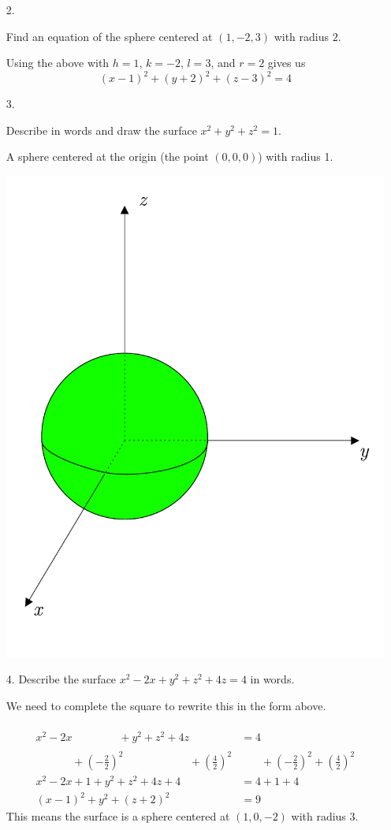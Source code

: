 \documentclass[12pt]{exam}
\begin{document}
  \begin{enumerate}
    \item[2.]{
      Find an equation of the sphere centered at $(1,-2,3)$ with radius $2$.
      \begin{solution}
        Using the above with \(h=1\), \(k=-2\), \(l=3\), and \(r=2\) gives us
        \[
          (x-1)^2+(y+2)^2+(z-3)^2=4
        \]
      \end{solution}
    }
    \item[3.]{
      Describe in words and draw the surface $x^{2}+y^{2}+z^{2}=1$.
      \begin{solution}
        A sphere centered at the origin (the point \((0,0,0)\)) with radius 1.
      \begin{center}
        \includegraphics[width=.6\textwidth]{12-1-sphere.pdf}
      \end{center}
      \end{solution}
    }
    \item[4.]{
      Describe the surface $x^{2}-2x+y^{2}+z^{2}+4z=4$ in words.
    }
    \begin{solution}
      We need to complete the square to rewrite this in the form above.

      \begin{align*}
        x^2-2x\phantom{+(-\frac{2}{2})^2}+y^2+z^2+4z\phantom{+(\frac{4}{2})^2} & = 4\\
      \phantom{x^2-2x}+\left(-\frac{2}{2}\right)^2\phantom{+y^2+z^2+4z}+\left(\frac{4}{2}\right)^2 &\phantom{ = 4} +\left(-\frac{2}{2}\right)^2+\left(\frac{4}{2}\right)^2\\
      x^2-2x+1+y^2+z^2+4z+4 & = 4+1+4\\
      (x-1)^2 + y^2 + (z+2)^2 & = 9
      \end{align*}
      This means the surface is a sphere centered at \((1,0,-2)\) with radius \(3\).
    \end{solution}
  \end{enumerate}
\end{document}
